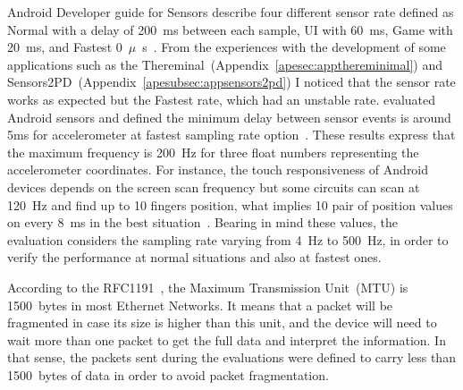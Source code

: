 
Android Developer guide for Sensors describe four different sensor rate defined as Normal with a delay of 200~ms between each sample, UI with 60~ms, Game with 20~ms, and Fastest 0~$\mu$~s~\cite{Android2017sensorsoverview}.
From the experiences with the development of some applications such as the Thereminal~(Appendix~\ref{apesec:appthereminimal}) and Sensors2PD~(Appendix~\ref{apesubsec:appsensors2pd}) I noticed that the sensor rate works as expected but the Fastest rate, which had an unstable rate.
 evaluated Android sensors and defined the minimum delay between sensor events is around 5ms for accelerometer at fastest sampling rate option~\cite{Ma2013experimental}.
These results express that the maximum frequency is 200~Hz for three float numbers representing the accelerometer coordinates.
For instance, the touch responsiveness of Android devices depends on the screen scan frequency but some circuits can scan at 120~Hz and find up to 10 fingers position, what implies 10 pair of position values on every 8~ms in the best situation~\cite{Padre2017touchresponsiveness}.
Bearing in mind these values, the evaluation considers the sampling rate varying from 4~Hz to 500~Hz, in order to verify the performance at normal situations and also at fastest ones.  

According to the RFC1191~\citep{RFC1191MTU}, the Maximum Transmission Unit~(MTU) is 1500~bytes in most Ethernet Networks.
It means that a packet will be fragmented in case its size is higher than this unit, and the device will need to wait more than one packet to get the full data and interpret the information.
In that sense, the packets sent during the evaluations were defined to carry less than 1500~bytes of data in order to avoid packet fragmentation.

